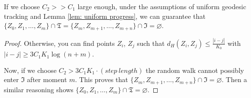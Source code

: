 \begin{lem}
	If we choose $C_2>>C_1$ large enough, under the assumptions of uniform geodesic tracking and Lemma \ref{lem: uniform progress}, we can guarantee that $\{Z_0,Z_1,\ldots ,Z_m\}\cap \mathfrak{T}=\{Z_m,Z_{m+1},\ldots ,Z_{m+n}\}\cap \mathfrak{I}=\varnothing$.
\end{lem}
\begin{proof}
	Otherwise, you can find points $Z_i$, $Z_j$ such that $d_H(Z_i,Z_j)\le  \frac{|i-j|}{K_0}$ with $|i-j|\ge 3 C_1 K_1\log(n+m)$.
	
	Now, if we choose $C_2> 3C_1K_1\cdot (step\ length)$ the random walk cannot possibly enter $\mathfrak{I}$ after moment $m$. This proves that $\{Z_m,Z_{m+1},\ldots ,Z_{m+n}\}\cap \mathfrak{I}=\varnothing$. Then a similar reasoning shows $\{Z_0,Z_1,\ldots ,Z_m\}\cap \mathfrak{T}=\varnothing$.
	
\end{proof}

